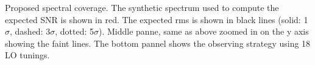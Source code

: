 Proposed spectral coverage. The synthetic spectrum used to compute the expected SNR is shown in red. The expected rms is shown in black lines (solid: 1$\sigma$, dashed: 3$\sigma$, dotted: 5$\sigma$). Middle panne, same as above zoomed in on the y axis showing the faint lines. The bottom pannel shows the observing strategy using 18 LO tunings.